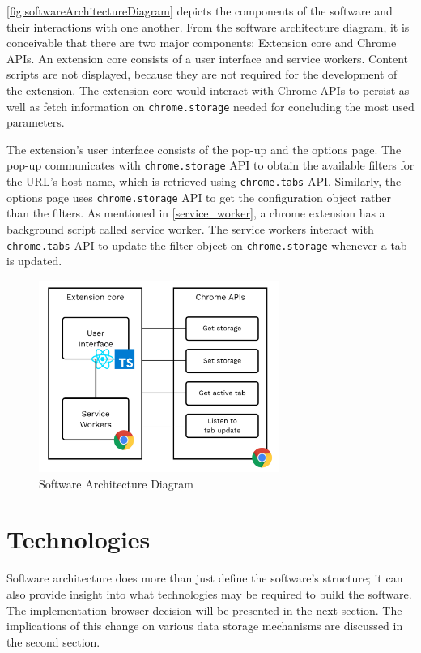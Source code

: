 \autoref{fig:softwareArchitectureDiagram} depicts the components of the software and their interactions with one another. From the software architecture diagram, it is conceivable that there are two major components: Extension core and Chrome APIs. An extension core consists of a user interface and service workers. Content scripts are not displayed, because they are not required for the development of the extension. The extension core would interact with Chrome APIs to persist as well as fetch information on \texttt{chrome.storage} needed for concluding the most used parameters.

The extension's user interface consists of the pop-up and the options page. The pop-up communicates with \texttt{chrome.storage} API to obtain the available filters for the URL's host name, which is retrieved using \texttt{chrome.tabs} API. Similarly, the options page uses \texttt{chrome.storage} API to get the configuration object rather than the filters. As mentioned in \autoref{service_worker}, a chrome extension has a background script called service worker. The service workers interact with \texttt{chrome.tabs} API to update the filter object on \texttt{chrome.storage} whenever a tab is updated.

\begin{figure}
  \centering
  \includegraphics[width=0.7\textwidth]{assets/software_architecture_diagram.png}
  \caption{Software Architecture Diagram}
  \label{fig:softwareArchitectureDiagram}
\end{figure}


\section{Technologies}
\label{technologies_used}
Software architecture does more than just define the software's structure; it can also provide insight into what technologies may be required to build the software. The implementation browser decision will be presented in the next section. The implications of this change on various data storage mechanisms are discussed in the second section.

